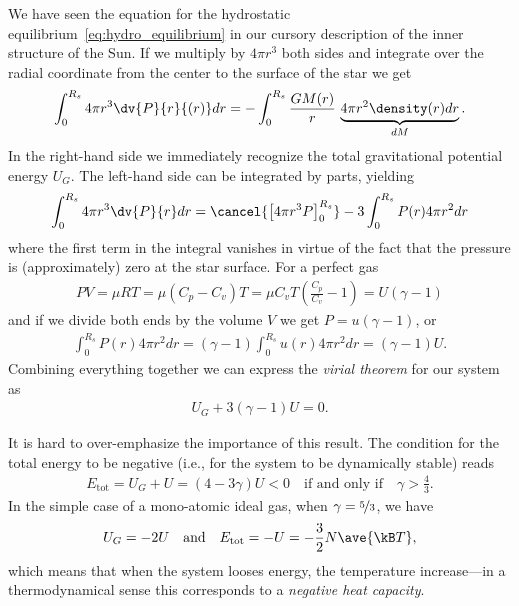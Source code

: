 We have seen the equation for the hydrostatic equilibrium~\eqref{eq:hydro_equilibrium}
in our cursory description of the inner structure of the Sun. If we multiply by
$4\pi r^3$ both sides and integrate over the radial coordinate from the center to
the surface of the star we get
\begin{align*}
  \int_0^{R_s} 4\pi r^3 \dv{P}{r}{(r)} dr =
  -\int_0^{R_s} \frac{GM(r)}{r} \, \underbrace{4\pi r^2 \density(r) dr}_{dM}.
\end{align*}
In the right-hand side we immediately recognize the total gravitational potential
energy $U_G$. The left-hand side can be integrated by parts, yielding
\begin{align*}
  \int_0^{R_s} 4\pi r^3 \dv{P}{r} dr =
  \cancel{\left[ 4\pi r^3 P \right]_0^{R_s}} - 3 \int_0^{R_s} P(r) 4\pi r^2 dr
\end{align*}
where the first term in the integral vanishes in virtue of the fact that the pressure
is (approximately) zero at the star surface. For a perfect gas
\begin{align*}
  PV = \mu RT = \mu (C_p - C_v)T =
  \mu C_v T \left( \frac{C_p}{C_v} - 1 \right) = U (\gamma - 1)
\end{align*}
and if we divide both ends by the volume $V$ we get $P = u (\gamma - 1)$, or
\begin{align*}
  \int_0^{R_s} P(r) 4\pi r^2 dr = (\gamma - 1) \int_0^{R_s} u(r) 4\pi r^2 dr =
  (\gamma - 1) U.
\end{align*}
Combining everything together we can express the \emph{virial theorem} for our system
as
\begin{align}
  U_G + 3 (\gamma - 1) U = 0.
\end{align}

It is hard to over-emphasize the importance of this result. The condition for the
total energy to be negative (i.e., for the system to be dynamically stable) reads
\begin{align*}
  E_\text{tot} = U_G + U = (4 - 3\gamma) U < 0 \quad\text{if and only if}\quad \gamma > \frac{4}{3}.
\end{align*}
In the simple case of a mono-atomic ideal gas, when $\gamma = \nicefrac{5}{3}$,
we have
\begin{align}
  U_G = - 2U \quad\text{and}\quad E_\text{tot} = - U = -\frac{3}{2} N \ave{\kB T},
\end{align}
which means that when the system looses energy, the temperature increase---in a
thermodynamical sense this corresponds to a \emph{negative heat capacity}.

